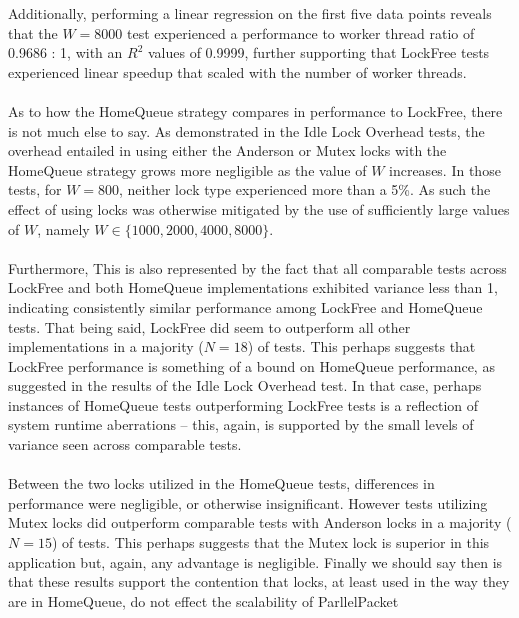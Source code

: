 \documentclass[]{article}
\begin{document}
Additionally, performing a linear regression on the first five data points reveals that the $W = 8000$ test experienced a performance to worker thread ratio of 0.9686 : 1, with an $R^2$ values of 0.9999, further supporting that LockFree tests experienced linear speedup that scaled with the number of worker threads.
\\\\
As to how the HomeQueue strategy compares in performance to LockFree, there is not much else to say. As demonstrated in the Idle Lock Overhead tests, the overhead entailed in using either the Anderson or Mutex locks with the HomeQueue strategy grows more negligible as the value of $W$ increases. In those tests, for $W = 800$, neither lock type experienced more than a 5\%. As such the effect of using locks was otherwise mitigated by the use of sufficiently large values of $W$, namely $W \in \{1000, 2000, 4000, 8000\}$. 
\\\\
Furthermore, This is also represented by the fact that all comparable tests across LockFree and both HomeQueue implementations exhibited variance less than 1, indicating consistently similar performance among LockFree and HomeQueue tests. That being said, LockFree did seem to outperform all other implementations in a majority ($N = 18$) of tests. This perhaps suggests that LockFree performance is something of a bound on HomeQueue performance, as suggested in the results of the Idle Lock Overhead test. In that case, perhaps instances of HomeQueue tests outperforming LockFree tests is a reflection of system runtime aberrations -- this, again, is supported by the small levels of variance seen across comparable tests.
\\\\
Between the two locks utilized in the HomeQueue tests, differences in performance were negligible, or otherwise insignificant. However tests utilizing Mutex locks did outperform comparable tests with Anderson locks in a majority ($N = 15$) of tests. This perhaps suggests that the Mutex lock is superior in this application but, again, any advantage is negligible.
Finally we should say then is that these results support the contention that locks, at least used in the way they are in HomeQueue, do not effect the scalability of ParllelPacket
\end{document}
